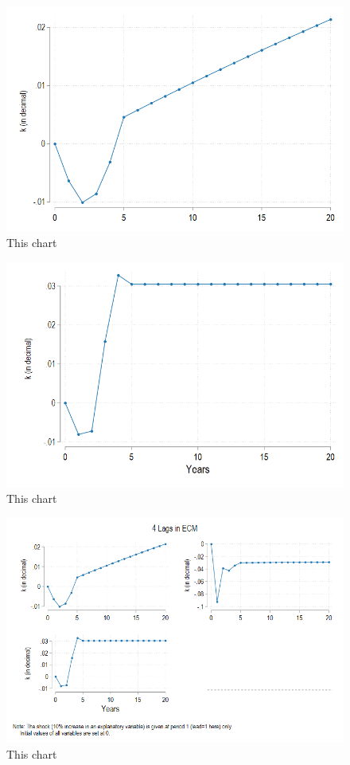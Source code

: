 
\begin{figure}[H]
    \centering
    \includegraphics[width=.75\linewidth]{_fig/FImpRes_k_income.png}
    \captionsetup{width=0.80\textwidth}
    \caption{\label{fig:app:seven}
     This chart }
\end{figure}
\clearpage


\begin{figure}[H]
    \centering
    \includegraphics[width=.75\linewidth]{_fig/FImpRes_k_pop.png}
    \captionsetup{width=0.80\textwidth}
    \caption{\label{fig:app:eight}
     This chart }
\end{figure}
\clearpage


\begin{figure}[H]
    \centering
    \includegraphics[width=.75\linewidth]{_fig/FImpulseResposne.png}
    \captionsetup{width=0.80\textwidth}
    \caption{\label{fig:app:nine}
     This chart }
\end{figure}
\clearpage

